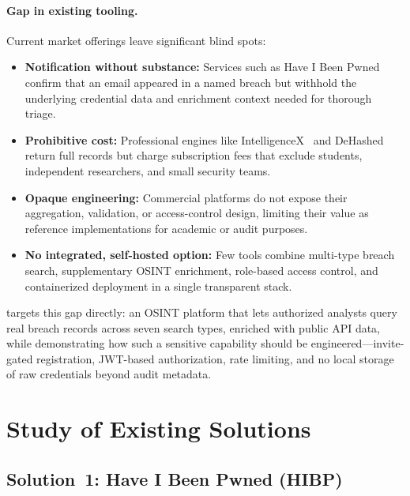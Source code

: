 \paragraph{Gap in existing tooling.}
Current market offerings leave significant blind spots:

\begin{itemize}[nosep]
  \item \textbf{Notification without substance:} Services such as Have I Been
        Pwned~\cite{hibp} confirm that an email appeared in a named breach
        but withhold the underlying credential data and enrichment context
        needed for thorough triage.
  \item \textbf{Prohibitive cost:} Professional engines like
        IntelligenceX~\cite{intelx} and DeHashed~\cite{dehashed} return
        full records but charge subscription fees that exclude students,
        independent researchers, and small security teams.
  \item \textbf{Opaque engineering:} Commercial platforms do not expose their
        aggregation, validation, or access-control design, limiting their
        value as reference implementations for academic or audit purposes.
  \item \textbf{No integrated, self-hosted option:} Few tools combine
        multi-type breach search, supplementary OSINT enrichment, role-based
        access control, and containerized deployment in a single transparent
        stack.
\end{itemize}

\leaklens{} targets this gap directly: an OSINT platform that lets
authorized analysts query real breach records across seven search types,
enriched with public API data, while demonstrating how such a sensitive
capability should be engineered---invite-gated registration, JWT-based
authorization, rate limiting, and no local storage of raw credentials beyond
audit metadata.

\section{Study of Existing Solutions}
\label{sec:existing}

\subsection{Solution~1: Have I Been Pwned (HIBP)}

